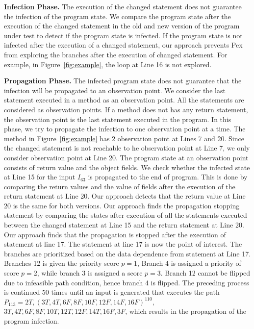 {\textbf{Infection Phase. }  The execution of the changed statement does not guarantee the infection of the program state. We compare the program state after the execution of the changed statement in the old and new version of the program under test to detect if the program state is infected. If the program state is not infected after the execution of a changed statement, our approach prevents Pex from exploring the branches after the execution of changed statement. For example, in Figure~\ref{fig:example}, the loop at Line 16 is not explored. 

\textbf{Propagation Phase. } The infected program state does not guarantee that the infection will be propagated to an observation point. We consider the last statement executed in a method as an observation point. All the  statements are considered as observation points. If a method does not has any return statement, the observation point is the last statement executed in the program. In this phase, we try to propagate the infection to one observation point at a time.
The method  in Figure~\ref{fig:example} has 2 observation point at Lines 7 and 20. Since the changed statement is not reachable to he observation point at Line 7, we only consider observation point at Line 20. The program state at an observation point consists of return value and the object fields. We check whether the infected state at Line 15 for the input $I_{63}$ is propagated to the end of program. This is done by comparing the return values and the value of fields after the execution of the return statement at Line 20. Our approach detects that the return value at Line 20 is the same for both versions. Our approach finds the propagation stopping statement by comparing the states after execution of all the statements executed between the changed statement at Line 15 and the return statement at Line 20. Our approach finds that the propagation is stopped after the execution of statement at line 17. The statement at line 17 is now the point of interest. The branches are prioritized based on the data dependence from statement at Line 17. Branches 12 is given the priority score $p=1$, Branch 4 is assigned a priority of score $p=2$, while branch 3 is assigned a score $p=3$. Branch 12 cannot be flipped due to infeasible path condition, hence branch 4 is flipped. The preceding process is continued 50 times until an input is generated that executes the path $P_{113}= 2T, (3T, 4T, 6F, 8F, 10F, 12F, 14F, 16F)^{110},$ $3T, 4T, 6F, 8F, 10T, 12T, 12F, 14T, 16F, 3F$, which results in the propagation of the program infection.
}
  
